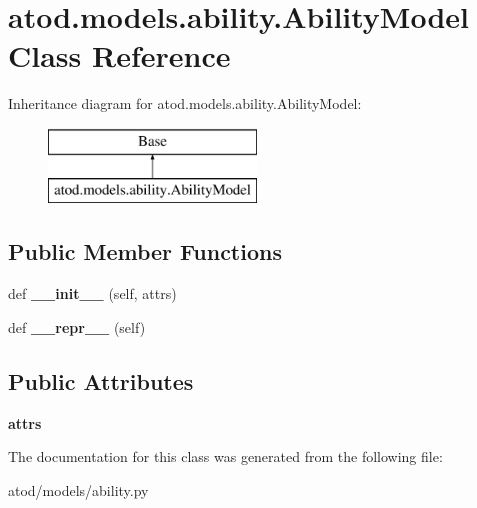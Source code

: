 \hypertarget{classatod_1_1models_1_1ability_1_1_ability_model}{}\section{atod.\+models.\+ability.\+Ability\+Model Class Reference}
\label{classatod_1_1models_1_1ability_1_1_ability_model}
Inheritance diagram for atod.\+models.\+ability.\+Ability\+Model\+:\begin{figure}[H]
\begin{center}
\leavevmode
\includegraphics[height=2.000000cm]{classatod_1_1models_1_1ability_1_1_ability_model}
\end{center}
\end{figure}
\subsection*{Public Member Functions}
\begin{DoxyCompactItemize}
\item 
def {\bfseries \+\_\+\+\_\+init\+\_\+\+\_\+} (self, attrs)\hypertarget{classatod_1_1models_1_1ability_1_1_ability_model_a4c1c21db1fbba3b7d7ca49ef1f3db453}{}\label{classatod_1_1models_1_1ability_1_1_ability_model_a4c1c21db1fbba3b7d7ca49ef1f3db453}

\item 
def {\bfseries \+\_\+\+\_\+repr\+\_\+\+\_\+} (self)\hypertarget{classatod_1_1models_1_1ability_1_1_ability_model_a36437d1045c2ae3bf66f2c4190546d51}{}\label{classatod_1_1models_1_1ability_1_1_ability_model_a36437d1045c2ae3bf66f2c4190546d51}

\end{DoxyCompactItemize}
\subsection*{Public Attributes}
\begin{DoxyCompactItemize}
\item 
{\bfseries attrs}\hypertarget{classatod_1_1models_1_1ability_1_1_ability_model_ae0a27b3c720d313a5afb2e70064a718f}{}\label{classatod_1_1models_1_1ability_1_1_ability_model_ae0a27b3c720d313a5afb2e70064a718f}

\end{DoxyCompactItemize}


The documentation for this class was generated from the following file\+:\begin{DoxyCompactItemize}
\item 
atod/models/ability.\+py\end{DoxyCompactItemize}

